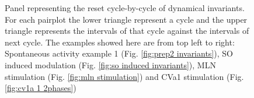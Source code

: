 \begin{figure}[htbp]
	\caption{Panel representing the reset cycle-by-cycle of dynamical invariants. For each pairplot the lower triangle represent a cycle and the upper triangle represents the intervals of that cycle against the intervals of next cycle. The examples showed here are from top left to right: Spontaneous activity example 1 (Fig. \ref{fig:prep2 invariants}), SO induced modulation (Fig. \ref{fig:so induced invariants}), MLN stimulation (Fig. \ref{fig:mln stimulation}) and CVa1 stimulation (Fig. \ref{fig:cv1a 1 2phases})}
	\label{fig:reset pairplot comparison}
\end{figure}

\clearpage
\newpage
